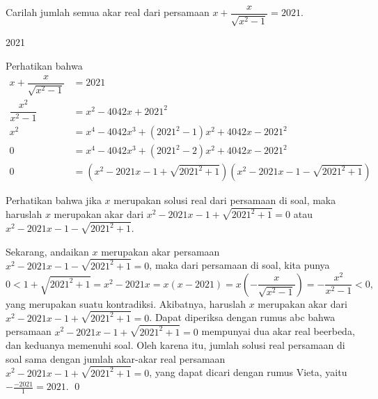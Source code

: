 \documentclass[11pt]{scrartcl}
\begin{document}
	\begin{soaljawab}
		Carilah jumlah semua akar real dari persamaan $x+\dfrac{x}{\sqrt{x^2-1}}=2021.$
		
		\begin{jawaban}
		2021
		\end{jawaban}
		\begin{solusi}
		Perhatikan bahwa
		\begin{align*}
		x+\dfrac{x}{\sqrt{x^2-1}} &= 2021 \\
		\dfrac{x^2}{x^2-1} &= x^2-4042x+2021^2 \\
		x^2 &= x^4-4042x^3+(2021^2-1)x^2+4042x-2021^2 \\
		0 &= x^4-4042x^3+(2021^2-2)x^2+4042x-2021^2 \\
		0 &= (x^2-2021x-1+\sqrt{2021^2+1})(x^2-2021x-1-\sqrt{2021^2+1})
		\end{align*}
		
		Perhatikan bahwa jika $x$ merupakan solusi real dari persamaan di soal, maka haruslah $x$ merupakan akar dari  $x^2-2021x-1+\sqrt{2021^2+1}=0$ atau $x^2-2021x-1-\sqrt{2021^2+1}$. 
		
		Sekarang, andaikan $x$ merupakan akar persamaan $x^2-2021x-1-\sqrt{2021^2+1}=0$, maka dari persamaan di soal, kita punya 
		$$0<1+\sqrt{2021^2+1}=x^2-2021x=x(x-2021)=x\left(-\dfrac{x}{\sqrt{x^2-1}}\right)=-\dfrac{x^2}{x^2-1}<0,$$
		yang merupakan suatu kontradiksi. Akibatnya, haruslah $x$ merupakan akar dari $x^2-2021x-1+\sqrt{2021^2+1}=0$. Dapat diperiksa dengan rumus abc bahwa persamaan  $x^2-2021x-1+\sqrt{2021^2+1}=0$ mempunyai dua akar real beerbeda, dan keduanya memenuhi soal. Oleh karena itu, jumlah solusi real persamaan di soal sama dengan jumlah akar-akar real persamaan  $x^2-2021x-1+\sqrt{2021^2+1}=0$, yang dapat dicari dengan rumus Vieta, yaitu $-\frac{-2021}{1}=2021$. \qed
		\end{solusi}
	\end{soaljawab}
	
\end{document}
